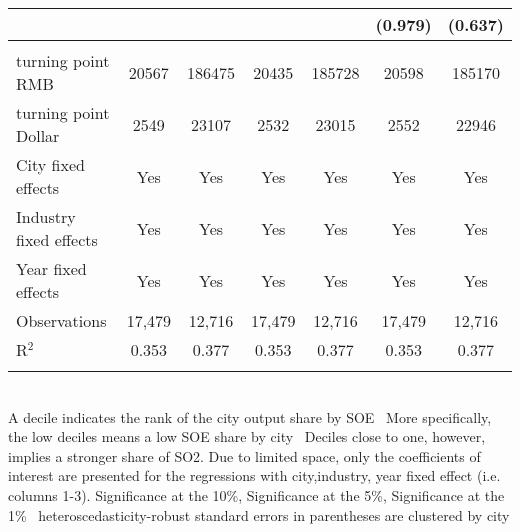 \documentclass[12pt]{article}
\begin{document}
\begin{table}[!htbp]
\begin{adjustbox}{width=\textwidth, totalheight=\baselineskip,keepaspectratio}
\begin{tabular}{@{\extracolsep{5pt}}lcccccc}
  &  &  &  &  & (0.979) & (0.637) \\ 
 \hline \\[-1.8ex] 
turning point RMB & 20567 & 186475 & 20435 & 185728 & 20598 & 185170 \\ 
turning point Dollar & 2549 & 23107 & 2532 & 23015 & 2552 & 22946 \\ 
City fixed effects & Yes & Yes & Yes & Yes & Yes & Yes \\ 
Industry fixed effects & Yes & Yes & Yes & Yes & Yes & Yes \\ 
Year fixed effects & Yes & Yes & Yes & Yes & Yes & Yes \\ 
Observations & 17,479 & 12,716 & 17,479 & 12,716 & 17,479 & 12,716 \\ 
R$^{2}$ & 0.353 & 0.377 & 0.353 & 0.377 & 0.353 & 0.377 \\ 
\hline 
\hline \\[-1.8ex] 
\end{tabular}
\end{adjustbox}
\begin{tablenotes} 
 \small 
 \item \\ 
\footnotesize{
A decile indicates the rank of the city output share by SOE \
More specifically, the low deciles means a low SOE share by city \
Deciles close to one, however, implies a stronger share of SO2.
Due to limited space, only the coefficients of interest are presented 
for the regressions with city,industry, year fixed effect (i.e. columns 1-3).
\sym{*} Significance at the 10\%, \sym{**} Significance at the 5\%, \sym{***} Significance at the 1\% \
heteroscedasticity-robust standard errors in parentheses are clustered by city 
}
 
\end{tablenotes}
\end{table}
\end{document}
